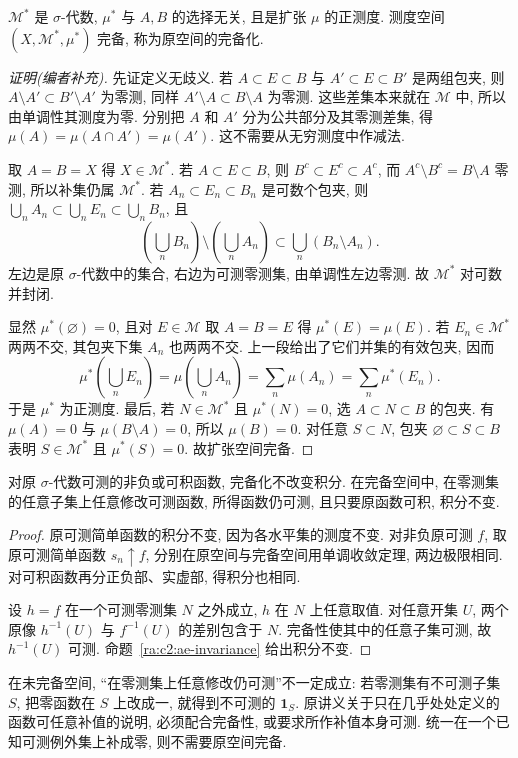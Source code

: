 \begin{theorem}\label{ra:c2:completion}
$\mathcal M^*$ 是 $\sigma$-代数, $\mu^*$ 与 $A,B$ 的选择无关, 且是扩张 $\mu$ 的正测度. 测度空间 $(X,\mathcal M^*,\mu^*)$ 完备, 称为原空间的完备化.
\end{theorem}
\begin{proof}[证明(编者补充)]
先证定义无歧义. 若 $A\subset E\subset B$ 与 $A'\subset E\subset B'$ 是两组包夹, 则 $A\setminus A'\subset B'\setminus A'$ 为零测, 同样 $A'\setminus A\subset B\setminus A$ 为零测. 这些差集本来就在 $\mathcal M$ 中, 所以由单调性其测度为零. 分别把 $A$ 和 $A'$ 分为公共部分及其零测差集, 得 $\mu(A)=\mu(A\cap A')=\mu(A')$. 这不需要从无穷测度中作减法.

取 $A=B=X$ 得 $X\in\mathcal M^*$. 若 $A\subset E\subset B$, 则 $B^c\subset E^c\subset A^c$, 而 $A^c\setminus B^c=B\setminus A$ 零测, 所以补集仍属 $\mathcal M^*$. 若 $A_n\subset E_n\subset B_n$ 是可数个包夹, 则 $\bigcup_nA_n\subset\bigcup_nE_n\subset\bigcup_nB_n$, 且
\[
 \left(\bigcup_n B_n\right)\setminus\left(\bigcup_n A_n\right)
 \subset\bigcup_n(B_n\setminus A_n).
\]
左边是原 $\sigma$-代数中的集合, 右边为可测零测集, 由单调性左边零测. 故 $\mathcal M^*$ 对可数并封闭.

显然 $\mu^*(\varnothing)=0$, 且对 $E\in\mathcal M$ 取 $A=B=E$ 得 $\mu^*(E)=\mu(E)$. 若 $E_n\in\mathcal M^*$ 两两不交, 其包夹下集 $A_n$ 也两两不交. 上一段给出了它们并集的有效包夹, 因而
\[
 \mu^*\left(\bigcup_nE_n\right)
 =\mu\left(\bigcup_nA_n\right)
 =\sum_n\mu(A_n)=\sum_n\mu^*(E_n).
\]
于是 $\mu^*$ 为正测度. 最后, 若 $N\in\mathcal M^*$ 且 $\mu^*(N)=0$, 选 $A\subset N\subset B$ 的包夹. 有 $\mu(A)=0$ 与 $\mu(B\setminus A)=0$, 所以 $\mu(B)=0$. 对任意 $S\subset N$, 包夹 $\varnothing\subset S\subset B$ 表明 $S\in\mathcal M^*$ 且 $\mu^*(S)=0$. 故扩张空间完备.
\end{proof}

\begin{proposition}[编者补充]\label{ra:c2:completion-function}
对原 $\sigma$-代数可测的非负或可积函数, 完备化不改变积分. 在完备空间中, 在零测集的任意子集上任意修改可测函数, 所得函数仍可测, 且只要原函数可积, 积分不变.
\end{proposition}
\begin{proof}
原可测简单函数的积分不变, 因为各水平集的测度不变. 对非负原可测 $f$, 取原可测简单函数 $s_n\uparrow f$, 分别在原空间与完备空间用单调收敛定理, 两边极限相同. 对可积函数再分正负部、实虚部, 得积分也相同.

设 $h=f$ 在一个可测零测集 $N$ 之外成立, $h$ 在 $N$ 上任意取值. 对任意开集 $U$, 两个原像 $h^{-1}(U)$ 与 $f^{-1}(U)$ 的差别包含于 $N$. 完备性使其中的任意子集可测, 故 $h^{-1}(U)$ 可测. 命题~\ref{ra:c2:ae-invariance} 给出积分不变.
\end{proof}
在未完备空间, ``在零测集上任意修改仍可测''不一定成立: 若零测集有不可测子集 $S$, 把零函数在 $S$ 上改成一, 就得到不可测的 $\mathbf1_S$. 原讲义关于只在几乎处处定义的函数可任意补值的说明, 必须配合完备性, 或要求所作补值本身可测. 统一在一个已知可测例外集上补成零, 则不需要原空间完备.

